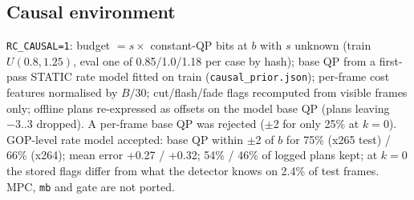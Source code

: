 \documentclass[10pt,a4paper]{article}
\newcommand{\code}[1]{\texttt{\small #1}}
\begin{document}
\subsection{Causal environment}
\code{RC\_CAUSAL=1}: budget $= s\times$ constant-QP bits at $b$ with $s$ unknown (train $U(0.8,1.25)$, eval one of
0.85/1.0/1.18 per case by hash); base QP from a first-pass STATIC rate model fitted on train
(\code{causal\_prior.json}); per-frame cost features normalised by $B/30$; cut/flash/fade flags recomputed from
visible frames only; offline plans re-expressed as offsets on the model base QP (plans leaving $-3..3$ dropped). A
per-frame base QP was rejected ($\pm$2 for only 25\% at $k=0$). GOP-level rate model accepted: base QP within $\pm$2 of
$b$ for 75\% (x265 test) / 66\% (x264); mean error +0.27 / +0.32; 54\% / 46\% of logged plans kept; at $k=0$ the stored
flags differ from what the detector knows on 2.4\% of test frames. MPC, \code{mb} and gate are not ported.

\end{document}
